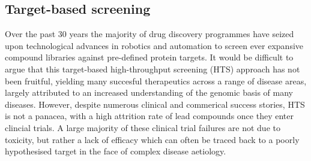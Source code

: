 \documentclass[a4paper,11pt,twoside,openright]{scrbook}
\begin{document}


\subsection{Target-based screening}
Over the past 30 years the majority of drug discovery programmes have seized upon technological advances in robotics and automation to screen ever expansive compound libraries against pre-defined protein targets.
It would be difficult to argue that this target-based high-throughput screening (HTS) approach has not been fruitful, yielding many succesful therapeutics across a range of disease areas, largely attributed to an increased understanding of the genomic basis of many diseases.
However, despite numerous clinical and commerical success stories, HTS is not a panacea, with a high attrition rate of lead compounds once they enter clincial trials. \cite{citation_needed}
A large majority of these clinical trial failures are not due to toxicity, but rather a lack of efficacy which can often be traced back to a poorly hypothesised target in the face of complex disease aetiology.
\end{document}
